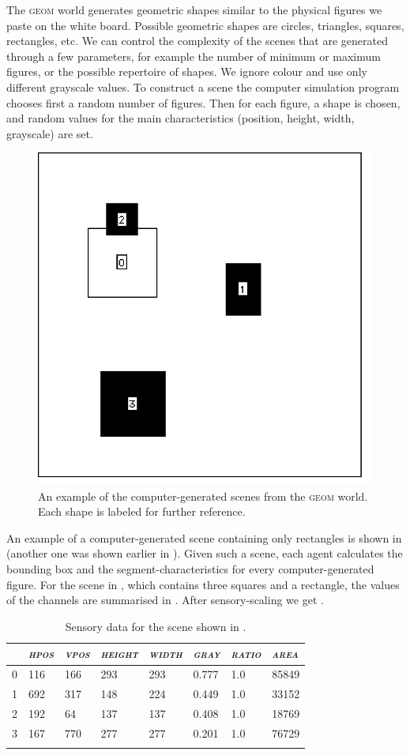 The \textsc{geom} world generates geometric shapes similar 
to the physical figures we paste on the white board. 
Possible geometric shapes are circles, triangles, 
squares, rectangles, etc. 
We can control the complexity
of the scenes that are generated  through a few parameters, for example the 
number of minimum or maximum figures, or the possible 
repertoire of shapes. We 
ignore colour and use only different grayscale 
values. To construct a scene the computer simulation 
program chooses first a random number of 
figures. Then for each figure, a shape is 
chosen, and random values for the main 
characteristics (position, height, width, grayscale)
are set. 

\begin{figure}[t]
  \centerline{\includegraphics[width=.45\textwidth]{chap3/figs/scene9.pdf}}
\caption{\label{geom3}An example of the 
computer-generated scenes from the \textsc{geom} world.
Each shape is labeled for further reference.}
\end{figure}

An example of a computer-generated 
scene containing only rectangles is shown in 
 (another one 
was shown earlier in ).
Given such a scene, each agent calculates
the bounding box and the segment-characteristics
for every computer-generated figure.
For the scene in , which contains three
squares and a rectangle, the values of the channels
are summarised in . After sensory-scaling we get . 

\begin{table}[h]
\begin{center}
\begin{tabular}{  l   l   l   l   l   l   l   l  }
\lsptoprule
 & {\itshape \textsc{hpos}} & {\itshape \textsc{vpos}} & {\itshape \textsc{height}} & {\itshape \textsc{width}} & {\itshape \textsc{gray}} & {\itshape \textsc{ratio}}  & {\itshape \textsc{area}} \\ \midrule
0 & 116 & 166 & 293 & 293 & 0.777 & 1.0 & 85849 \\ 
1 & 692 & 317 & 148 & 224 & 0.449 & 1.0 & 33152 \\ 
2 & 192 & 64 & 137 & 137 & 0.408 & 1.0 & 18769 \\ 
3 & 167 & 770 & 277 & 277 & 0.201 & 1.0 & 76729 \\ 
\lspbottomrule
\end{tabular}
\end{center}
\caption{\label{tab:t-geom}Sensory data for the scene shown in .}
\end{table}


